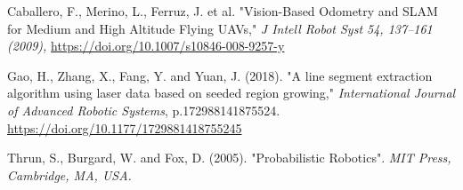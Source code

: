\documentclass[12pt]{article}
\begin{document}
\begin{thebibliography}{9}
    Caballero, F., Merino, L., Ferruz, J. et al. "Vision-Based Odometry and SLAM for Medium and High Altitude Flying UAVs,"
    \textit{J Intell Robot Syst 54, 137–161 (2009),}
    \href{https://doi.org/10.1007/s10846-008-9257-y}{https://doi.org/10.1007/s10846-008-9257-y}

    Gao, H., Zhang, X., Fang, Y. and Yuan, J. (2018). "A line segment extraction algorithm using laser data based on seeded region growing,"
    \textit{International Journal of Advanced Robotic Systems}, p.172988141875524.
    \href{https://doi.org/10.1177/1729881418755245}{https://doi.org/10.1177/1729881418755245}

    Thrun, S., Burgard, W. and Fox, D. (2005). "Probabilistic Robotics".
    \textit{MIT Press, Cambridge, MA, USA.}

\end{thebibliography}
\end{document}
